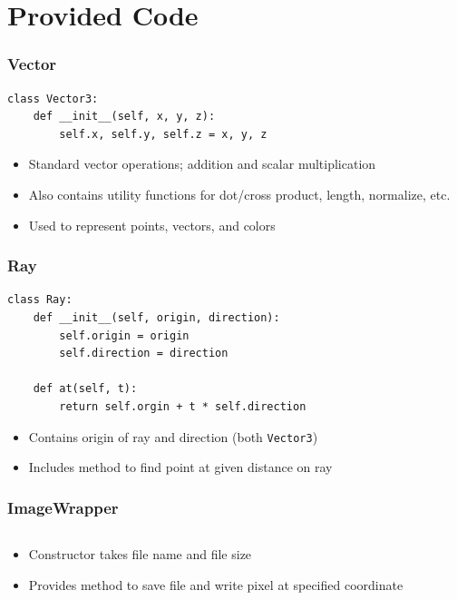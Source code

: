 \documentclass{beamer}
\begin{document}
\section{Provided Code}

\begin{frame}[fragile]
	\frametitle{Vector}
	\begin{verbatim}
class Vector3:
    def __init__(self, x, y, z):
        self.x, self.y, self.z = x, y, z
	\end{verbatim}
	\begin{itemize}
		\item Standard vector operations; addition and scalar multiplication
		\item Also contains utility functions for dot/cross product, length, normalize, etc.
		\item Used to represent points, vectors, and colors
	\end{itemize}
\end{frame}

\begin{frame}[fragile]
	\frametitle{Ray}
	\begin{verbatim}
class Ray:
    def __init__(self, origin, direction):
        self.origin = origin
        self.direction = direction
        
    def at(self, t):
        return self.orgin + t * self.direction
\end{verbatim}
	\begin{itemize}
		\item Contains origin of ray and direction (both \texttt{Vector3})
		\item Includes method to find point at given distance on ray
	\end{itemize}
\end{frame}

\begin{frame}
	\frametitle{ImageWrapper}
	\inputminted{python}{scripts/wrapper.py}
	\begin{itemize}
		\item Constructor takes file name and file size
		\item Provides method to save file and write pixel at specified coordinate
	\end{itemize}
\end{frame}
\end{document}
